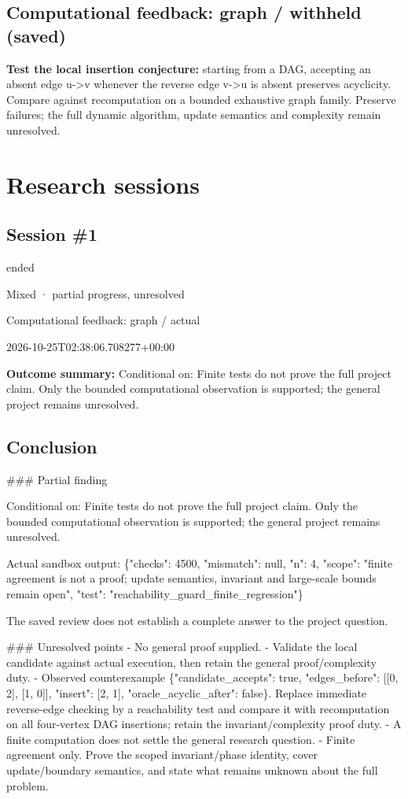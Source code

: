 \documentclass[11pt]{article}
\begin{document}
\subsection{Computational feedback: graph / withheld (saved)}
\textbf{Test the local insertion conjecture:} starting from a DAG, accepting an absent edge u-\textgreater{}v whenever the reverse edge v-\textgreater{}u is absent preserves acyclicity. Compare against recomputation on a bounded exhaustive graph family. Preserve failures; the full dynamic algorithm, update semantics and complexity remain unresolved.\par
\section{Research sessions}
\subsection{Session \#1}
\begin{description}[style=nextline,font=\normalfont\bfseries,leftmargin=0pt,labelsep=0pt]
\item[Execution status] ended
\item[Outcome] Mixed · partial progress, unresolved
\item[Strategy] Computational feedback: graph / actual
\item[Started] 2026-10-25T02:38:06.708277+00:00
\end{description}
\textbf{Outcome summary:} Conditional on: Finite tests do not prove the full project claim. Only the bounded computational observation is supported; the general project remains unresolved.\par
\subsection{Conclusion}
\#\#\# Partial finding

Conditional on: Finite tests do not prove the full project claim. Only the bounded computational observation is supported; the general project remains unresolved.

Actual sandbox output: \{"checks": 4500, "mismatch": null, "n": 4, "scope": "finite agreement is not a proof; update semantics, invariant and large-scale bounds remain open", "test": "reachability\_guard\_finite\_regression"\}

The saved review does not establish a complete answer to the project question.

\#\#\# Unresolved points
- No general proof supplied.
- Validate the local candidate against actual execution, then retain the general proof/complexity duty.
- Observed counterexample \{"candidate\_accepts": true, "edges\_before": [[0, 2], [1, 0]], "insert": [2, 1], "oracle\_acyclic\_after": false\}. Replace immediate reverse-edge checking by a reachability test and compare it with recomputation on all four-vertex DAG insertions; retain the invariant/complexity proof duty.
- A finite computation does not settle the general research question.
- Finite agreement only. Prove the scoped invariant/phase identity, cover update/boundary semantics, and state what remains unknown about the full problem.
\end{document}
